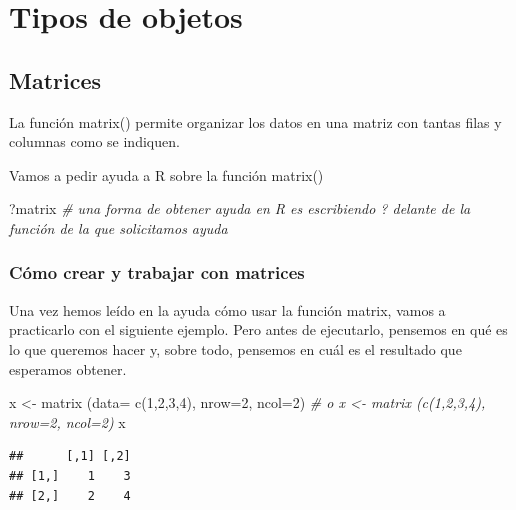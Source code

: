 \documentclass[
]{book}
\newenvironment{Shaded}{\begin{snugshade}}{\end{snugshade}}
\newcommand{\AttributeTok}[1]{\textcolor[rgb]{0.77,0.63,0.00}{#1}}
\newcommand{\CommentTok}[1]{\textcolor[rgb]{0.56,0.35,0.01}{\textit{#1}}}
\newcommand{\DecValTok}[1]{\textcolor[rgb]{0.00,0.00,0.81}{#1}}
\newcommand{\FunctionTok}[1]{\textcolor[rgb]{0.00,0.00,0.00}{#1}}
\newcommand{\NormalTok}[1]{#1}
\newcommand{\OtherTok}[1]{\textcolor[rgb]{0.56,0.35,0.01}{#1}}
\begin{document}
\hypertarget{tipos-de-objetos}{%
\section{Tipos de objetos}\label{tipos-de-objetos}}

\hypertarget{matrices}{%
\subsection{Matrices}\label{matrices}}

La función matrix() permite organizar los datos en una matriz con tantas filas y columnas como se indiquen.

Vamos a pedir ayuda a R sobre la función matrix()

\begin{Shaded}
\begin{Highlighting}[]
\NormalTok{?matrix }\CommentTok{\# una forma de obtener ayuda en R es escribiendo ? delante de la función de la que solicitamos ayuda}
\end{Highlighting}
\end{Shaded}

\hypertarget{cuxf3mo-crear-y-trabajar-con-matrices}{%
\subsubsection{Cómo crear y trabajar con matrices}\label{cuxf3mo-crear-y-trabajar-con-matrices}}

Una vez hemos leído en la ayuda cómo usar la función matrix, vamos a practicarlo con el siguiente ejemplo. Pero antes de ejecutarlo, pensemos en qué es lo que queremos hacer y, sobre todo, pensemos en cuál es el resultado que esperamos obtener.

\begin{Shaded}
\begin{Highlighting}[]
\NormalTok{x }\OtherTok{\textless{}{-}} \FunctionTok{matrix}\NormalTok{ (}\AttributeTok{data=} \FunctionTok{c}\NormalTok{(}\DecValTok{1}\NormalTok{,}\DecValTok{2}\NormalTok{,}\DecValTok{3}\NormalTok{,}\DecValTok{4}\NormalTok{), }\AttributeTok{nrow=}\DecValTok{2}\NormalTok{, }\AttributeTok{ncol=}\DecValTok{2}\NormalTok{) }\CommentTok{\# o x \textless{}{-} matrix (c(1,2,3,4), nrow=2, ncol=2)}
\NormalTok{x}
\end{Highlighting}
\end{Shaded}

\begin{verbatim}
##      [,1] [,2]
## [1,]    1    3
## [2,]    2    4
\end{verbatim}
\end{document}
